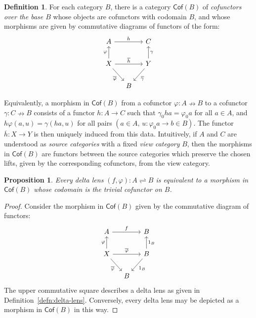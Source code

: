 \documentclass[colorlinks = true, a4paper, oneside, reqno, 11pt]{amsart}
\newtheorem{proposition}[theorem]{Proposition}
\theoremstyle{definition}
\newtheorem{definition}[theorem]{Definition}
\theoremstyle{remark}
\newcommand{\Cof}{\mathsf{Cof}}
\newcommand{\phibar}{\overline{\varphi}}
\begin{document}
\begin{definition}\label{defn:category-cofunctors}
For each category $B$, there is a category $\Cof(B)$ of \emph{cofunctors over the base $B$} 
whose objects are cofunctors with codomain $B$, and whose morphisms are given by commutative 
diagrams of functors of the form:
\begin{equation}\label{diagram:morphism-cofunctors}
\begin{tikzcd}[column sep = small]
A 
\arrow[rr, "h"]
& & C
\\
X
\arrow[u, "\varphi"]
\arrow[rr, "\overline{h}"]
\arrow[rd, "\phibar"']
& & Y 
\arrow[u, "\gamma"']
\arrow[ld, "\overline{\gamma}"]
\\
& B &
\end{tikzcd}
\end{equation}
\end{definition}

Equivalently, a morphism in $\Cof(B)$ from a cofunctor $\varphi \colon A \nrightarrow B$ 
to a cofunctor $\gamma \colon C \nrightarrow B$ consists of a functor 
$h \colon A \rightarrow C$ such that $\gamma_{0}ha = \varphi_{0}a$ for all $a \in A$,
and $h\varphi(a, u) = \gamma(ha, u)$ for all pairs 
$(a \in A, \, u \colon \varphi_{0}a \rightarrow b \in B)$.
The functor $\overline{h} \colon X \rightarrow Y$ is then uniquely induced 
from this data. 
Intuitively, if $A$ and $C$ are understood as \emph{source categories} with a fixed
\emph{view category} $B$, then the morphisms in $\Cof(B)$ are functors between the source 
categories which preserve the chosen lifts, given by the 
corresponding cofunctors, from the view category.

\begin{proposition}\label{prop:delta-lens}
Every delta lens $(f, \varphi) \colon A \rightleftharpoons B$ is equivalent to a morphism 
in $\Cof(B)$ whose codomain is the trivial cofunctor on $B$. 
\end{proposition}
\begin{proof}
Consider the morphism in $\Cof(B)$ given by the commutative diagram of functors: 
\begin{equation}\label{diagram:morphism-trivial-cofunctor}
\begin{tikzcd}[column sep = small]
A 
\arrow[rr, "f"]
& & B
\\
X
\arrow[u, "\varphi"]
\arrow[rr, "\phibar"]
\arrow[rd, "\phibar"']
& & B 
\arrow[u, "1_{B}"']
\arrow[ld, "1_{B}"]
\\
& B &
\end{tikzcd}
\end{equation}
The upper commutative square describes a delta lens as given in Definition~\ref{defn:delta-lens}.
Conversely, every delta lens may be depicted as a morphism in $\Cof(B)$ in this way.
\end{proof}
\end{document}
